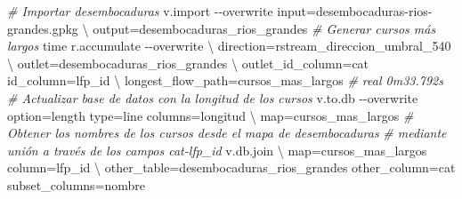 \documentclass[spanish]{article}
\newenvironment{Shaded}{\begin{snugshade}}{\end{snugshade}}
\newcommand{\AttributeTok}[1]{\textcolor[rgb]{0.77,0.63,0.00}{#1}}
\newcommand{\BuiltInTok}[1]{#1}
\newcommand{\CommentTok}[1]{\textcolor[rgb]{0.56,0.35,0.01}{\textit{#1}}}
\newcommand{\DataTypeTok}[1]{\textcolor[rgb]{0.13,0.29,0.53}{#1}}
\newcommand{\ExtensionTok}[1]{#1}
\newcommand{\NormalTok}[1]{#1}
\begin{document}
\begin{Shaded}
\begin{Highlighting}[]
\CommentTok{\# Importar desembocaduras}
\ExtensionTok{v.import} \AttributeTok{{-}{-}overwrite}\NormalTok{ input=desembocaduras{-}rios{-}grandes.gpkg }\DataTypeTok{\textbackslash{}}
\NormalTok{  output=desembocaduras\_rios\_grandes}
\CommentTok{\# Generar cursos más largos}
\BuiltInTok{time}\NormalTok{ r.accumulate }\AttributeTok{{-}{-}overwrite} \DataTypeTok{\textbackslash{}}
\NormalTok{  direction=rstream\_direccion\_umbral\_540 }\DataTypeTok{\textbackslash{}}
\NormalTok{  outlet=desembocaduras\_rios\_grandes }\DataTypeTok{\textbackslash{}}
\NormalTok{  outlet\_id\_column=cat id\_column=lfp\_id }\DataTypeTok{\textbackslash{}}
\NormalTok{  longest\_flow\_path=cursos\_mas\_largos}
\CommentTok{\# real  0m33.792s}
\CommentTok{\# Actualizar base de datos con la longitud de los cursos}
\ExtensionTok{v.to.db} \AttributeTok{{-}{-}overwrite}\NormalTok{ option=length type=line columns=longitud }\DataTypeTok{\textbackslash{}}
\NormalTok{  map=cursos\_mas\_largos}
\CommentTok{\# Obtener los nombres de los cursos desde el mapa de desembocaduras}
\CommentTok{\# mediante unión a través de los campos cat{-}lfp\_id}
\ExtensionTok{v.db.join} \DataTypeTok{\textbackslash{}}
\NormalTok{  map=cursos\_mas\_largos column=lfp\_id }\DataTypeTok{\textbackslash{}}
\NormalTok{  other\_table=desembocaduras\_rios\_grandes other\_column=cat subset\_columns=nombre}



\end{Highlighting}
\end{Shaded}
\end{document}
